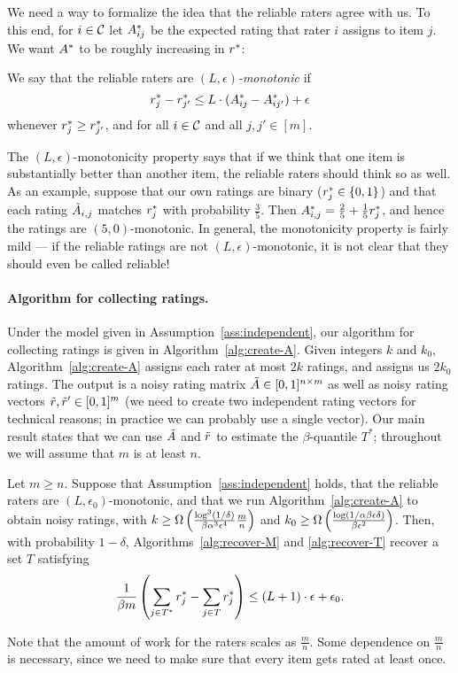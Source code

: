 We need a way to formalize the idea that the reliable raters 
agree with us. To this end, for $i \in \mathcal{C}$ let $A^*_{ij}$ be
the expected rating that rater $i$ assigns to item $j$.
We want $A^*$ to be roughly increasing in $r^*$:
\begin{definition}
\label{def:lipschitz}
We say that the reliable raters are \emph{$(L,\epsilon)$-monotonic} if 
\vskip -0.18in
\begin{equation}
\label{eq:lipschitz}
r^*_j - r^*_{j'} \leq L \cdot (A^*_{ij} - A^*_{ij'}) + \epsilon
\end{equation}
\vskip -0.07in
whenever $r^*_j \geq r^*_{j'}$, and
for all $i \in \mathcal{C}$ and all $j,j' \in [m]$.
\end{definition}
The $(L,\epsilon)$-monotonicity property says that if we think that one item is 
substantially better than another item, the reliable raters should think 
so as well. As an example, suppose that our own ratings are binary 
($r^*_j \in \{0,1\}$) and that each rating $\tilde{A}_{i,j}$ matches $r^*_j$ 
with probability $\frac{3}{5}$. Then 
$A^*_{i,j} = \frac{2}{5} + \frac{1}{5}r^*_j$, 
and hence the ratings are $(5,0)$-monotonic. 
In general, the monotonicity property is fairly mild --- if the reliable ratings 
are not $(L,\epsilon)$-monotonic, it is not clear that they should 
even be called reliable!

\paragraph{Algorithm for collecting ratings.}
Under the model given in Assumption~\ref{ass:independent}, 
our algorithm for collecting ratings is given in 
Algorithm~\ref{alg:create-A}. Given integers $k$ and $k_0$, 
Algorithm~\ref{alg:create-A} assigns each rater at most $2k$ 
ratings, and assigns us $2k_0$ ratings. The output is a 
noisy rating matrix $\tilde{A} \in [0,1]^{n \times m}$ as well 
as noisy rating vectors $\tilde{r}, \tilde{r}' \in [0,1]^m$ (we need 
to create two independent rating vectors for technical reasons; 
in practice we can probably use a single vector).
Our main result states that we can use $\tilde{A}$ and $\tilde{r}$ to 
estimate the $\beta$-quantile $T^*$; throughout we will assume 
that $m$ is at least $n$.
\begin{theorem}
\label{thm:main}
Let $m \geq n$. 
Suppose that Assumption~\ref{ass:independent} holds, that 
the reliable raters are $(L,\epsilon_0)$-monotonic, and 
that we run Algorithm~\ref{alg:create-A} to obtain noisy ratings, 
with $k \geq \Omega\left( \frac{\log^3(1/\delta)}{\beta\alpha^3\epsilon^4}\frac{m}{n} \right)$ and
$k_0 \geq \Omega\left( \frac{\log(1/\alpha\beta\epsilon\delta)}{\beta\epsilon^2} \right)$.
Then, with probability $1-\delta$, 
Algorithms~\ref{alg:recover-M} and \ref{alg:recover-T} recover a set $T$ satisfying 
\vskip -0.18in
\[ \frac{1}{\beta m} \left( \sum_{j \in T^*} r^*_j - \sum_{j \in T} r^*_j \right) 
\leq (L+1) \cdot \epsilon + \epsilon_0. \]
\vskip -0.07in
\end{theorem}
Note that the amount of work for the raters scales as $\frac{m}{n}$. Some dependence 
on $\frac{m}{n}$ is necessary, since we need to make sure that every item gets rated at least once.

